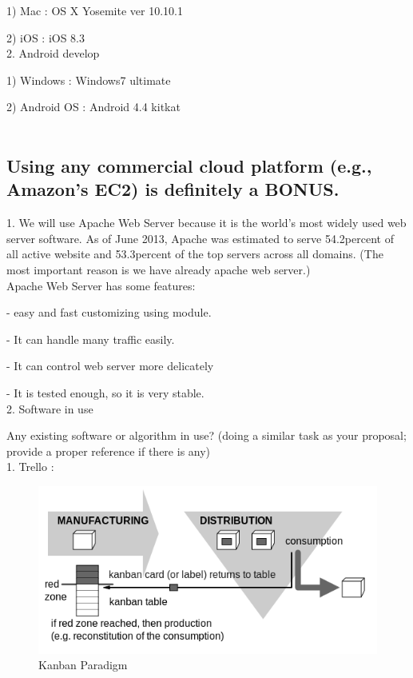 \documentclass[conference]{IEEEtran}
\begin{document}
  1) Mac : OS X Yosemite ver 10.10.1

  2) iOS : iOS 8.3\\

2. Android develop

  1) Windows : Windows7 ultimate

  2) Android OS : Android 4.4 kitkat\\\\

\subsection{Using any commercial cloud platform (e.g., Amazon’s EC2) is definitely a BONUS.\\  }
1.   We will use Apache  Web Server because  it is the world's most widely used web server software. As of June 2013, Apache was estimated to serve 54.2percent of all active website and 53.3percent of the top servers across all domains. (The most important reason is we have already apache web server.)\\

Apache Web Server has some features: 
	
\quad- easy and fast customizing using module. 

\quad- It can handle many traffic easily.

\quad- It can control web server more delicately

\quad- It is tested enough, so it is very stable.\\


2. Software in use 

Any existing software or algorithm in use? (doing a similar task as your proposal; provide a proper reference if there is any)\\

1. Trello : \\

\begin{figure}[htbp]
\begin{center}
    \includegraphics[scale=0.5]{img_kanban}
    \caption{Kanban Paradigm} 
\end{center}
\end{figure}
\end{document}

